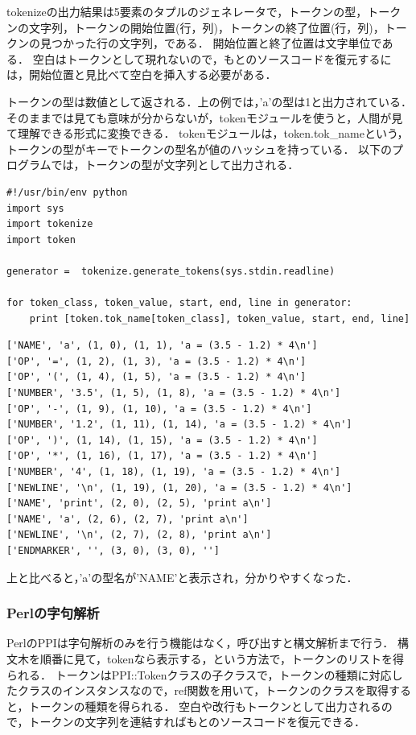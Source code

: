 \documentclass{cs-thesis}
\begin{document}
tokenizeの出力結果は5要素のタプルのジェネレータで，トークンの型，トークンの文字列，トークンの開始位置(行，列)，トークンの終了位置(行，列)，トークンの見つかった行の文字列，である．
開始位置と終了位置は文字単位である．
空白はトークンとして現れないので，もとのソースコードを復元するには，開始位置と見比べて空白を挿入する必要がある．

トークンの型は数値として返される．上の例では，'a'の型は1と出力されている．そのままでは見ても意味が分からないが，tokenモジュールを使うと，人間が見て理解できる形式に変換できる．
tokenモジュールは，token.tok\_nameという，トークンの型がキーでトークンの型名が値のハッシュを持っている．
以下のプログラムでは，トークンの型が文字列として出力される．

\begin{framed}
\begin{verbatim}
#!/usr/bin/env python
import sys
import tokenize
import token

generator =  tokenize.generate_tokens(sys.stdin.readline)

for token_class, token_value, start, end, line in generator:
    print [token.tok_name[token_class], token_value, start, end, line]
\end{verbatim}
\end{framed}

\begin{framed}
\begin{verbatim}
['NAME', 'a', (1, 0), (1, 1), 'a = (3.5 - 1.2) * 4\n']
['OP', '=', (1, 2), (1, 3), 'a = (3.5 - 1.2) * 4\n']
['OP', '(', (1, 4), (1, 5), 'a = (3.5 - 1.2) * 4\n']
['NUMBER', '3.5', (1, 5), (1, 8), 'a = (3.5 - 1.2) * 4\n']
['OP', '-', (1, 9), (1, 10), 'a = (3.5 - 1.2) * 4\n']
['NUMBER', '1.2', (1, 11), (1, 14), 'a = (3.5 - 1.2) * 4\n']
['OP', ')', (1, 14), (1, 15), 'a = (3.5 - 1.2) * 4\n']
['OP', '*', (1, 16), (1, 17), 'a = (3.5 - 1.2) * 4\n']
['NUMBER', '4', (1, 18), (1, 19), 'a = (3.5 - 1.2) * 4\n']
['NEWLINE', '\n', (1, 19), (1, 20), 'a = (3.5 - 1.2) * 4\n']
['NAME', 'print', (2, 0), (2, 5), 'print a\n']
['NAME', 'a', (2, 6), (2, 7), 'print a\n']
['NEWLINE', '\n', (2, 7), (2, 8), 'print a\n']
['ENDMARKER', '', (3, 0), (3, 0), '']
\end{verbatim}
\end{framed}

上と比べると，'a'の型名が'NAME'と表示され，分かりやすくなった．

  \subsubsection{Perlの字句解析}
PerlのPPIは字句解析のみを行う機能はなく，呼び出すと構文解析まで行う．
構文木を順番に見て，tokenなら表示する，という方法で，トークンのリストを得られる．
トークンはPPI::Tokenクラスの子クラスで，トークンの種類に対応したクラスのインスタンスなので，ref関数を用いて，トークンのクラスを取得すると，トークンの種類を得られる．
空白や改行もトークンとして出力されるので，トークンの文字列を連結すればもとのソースコードを復元できる．
\end{document}
